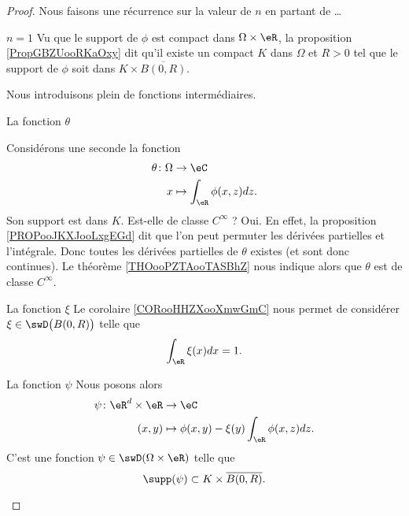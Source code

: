 \begin{proof}
    Nous faisons une récurrence sur la valeur de \( n\) en partant de \ldots
    \begin{subproof}
    \item[\( n=1\)]
        Vu que le support de \( \phi\) est compact dans \( \Omega\times \eR\), la proposition \ref{PropGBZUooRKaOxy} dit qu'il existe un compact \( K\) dans \( \Omega\) et \( R>0\) tel que le support de \( \phi\) soit dans \( K\times \overline{ B(0,R) }\). 

        Nous introduisons plein de fonctions intermédiaires.
        \begin{subproof}
        \item[La fonction \( \theta\)]
            

        Considérons une seconde la fonction
        \begin{equation}
            \begin{aligned}
                \theta\colon \Omega&\to \eC \\
                x&\mapsto \int_{\eR}\phi(x,z)dz. 
            \end{aligned}
        \end{equation}
        Son support est dans \( K\). Est-elle de classe \(  C^{\infty}\) ? Oui. En effet, la proposition \ref{PROPooJKXJooLxgEGd} dit que l'on peut permuter les dérivées partielles et l'intégrale. Donc toutes les dérivées partielles de \( \theta\) existes (et sont donc continues). Le théorème \ref{THOooPZTAooTASBhZ} nous indique alors que \( \theta\) est de classe \( C^{\infty}\).

    \item[La fonction \( \xi\)]
        Le corolaire \ref{CORooHHZXooXmwGmC} nous permet de considérer \( \xi\in \swD\big( B(0,R) \big)\) telle que
        \begin{equation}
            \int_{\eR}\xi(x)dx=1.
        \end{equation}
    \item[La fonction \( \psi\)]
        Nous posons alors
        \begin{equation}
            \begin{aligned}
                \psi\colon \eR^d\times \eR&\to \eC \\
                (x,y)&\mapsto \phi(x,y)-\xi(y)\int_{\eR}\phi(x,z)dz. 
            \end{aligned}
        \end{equation}
        C'est une fonction \( \psi\in \swD(\Omega\times \eR)\) telle que
        \begin{equation}
            \supp(\psi)\subset K\times \overline{ B(0,R) }.
        \end{equation}
        

\end{subproof}
\end{subproof}
\end{proof}
